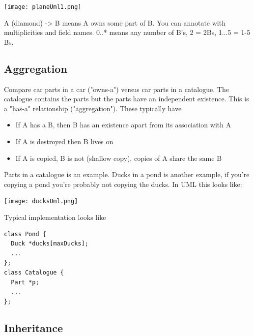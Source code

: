 \documentclass[english, 11pt]{article}
\begin{document}
\begin{center}
  \texttt{[image: planeUml1.png]}
\end{center}


 A (diamond) -> B means A owns some part of B.
You can annotate with multiplicities and field names. 0..* means any number of B's, 2 = 2Bs, 1...5 = 1-5 Bs.

\subsection{Aggregation}

Compare car parts in a car ("owns-a") versus car parts in a catalogue. The catalogue contains the parts but the parts have an independent existence. This is a "has-a" relationship ("aggregation"). These typically have
\begin{itemize}
  \item If A has a B, then B has an existence apart from its association with A
  \item If A is destroyed then B lives on
  \item If A is copied, B is not (shallow copy), copies of A share the same B
\end{itemize}
\begin{exmp}
  Parts in a catalogue is an example. Ducks in a pond is another example, if you're copying a pond you're probably not copying the ducks. In UML this looks like:

 \texttt{[image: ducksUml.png]}
\end{exmp}
Typical implementation looks like
\begin{lstlisting}
class Pond {
  Duck *ducks[maxDucks];
  ...
};
class Catalogue {
  Part *p;
  ...
};
\end{lstlisting}

\subsection{Inheritance}
\end{document}
